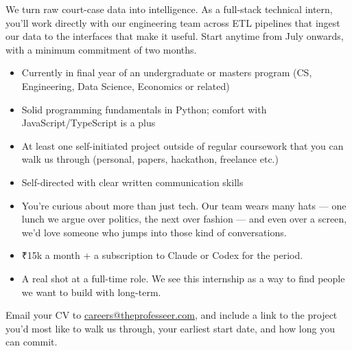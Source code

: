 \documentclass[11pt]{article}
\begin{document}
\pagestyle{empty}

\jdheader{}


\vspace{4mm}


We turn raw court-case data into intelligence. As a full-stack technical intern, you'll work directly with our engineering team across ETL pipelines that ingest our data to the interfaces that make it useful. Start anytime from July onwards, with a minimum commitment of two months.

\begin{itemize}
  \item Currently in final year of an undergraduate or masters program (CS, Engineering, Data Science, Economics or related)
  \item Solid programming fundamentals in Python; comfort with JavaScript/TypeScript is a plus
  \item At least one self-initiated project outside of regular coursework that you can walk us through (personal, papers, hackathon, freelance etc.)
  \item Self-directed with clear written communication skills
\end{itemize}

\begin{itemize}
  \item You're curious about more than just tech. Our team wears many hats — one lunch we argue over politics, the next over fashion — and even over a screen, we'd love someone who jumps into those kind of conversations.
\end{itemize}

\begin{itemize}
  \item ₹15k a month + a subscription to Claude or Codex for the period.
  \item A real shot at a full-time role. We see this internship as a way to find people we want to build with long-term.
\end{itemize}

Email your CV to \href{mailto:careers@theprofesseer.com}{\textcolor{profCrimson}{\underline{careers@theprofesseer.com}}}, and include a link to the project you'd most like to walk us through, your earliest start date, and how long you can commit.

\jdfooter{}
\end{document}

